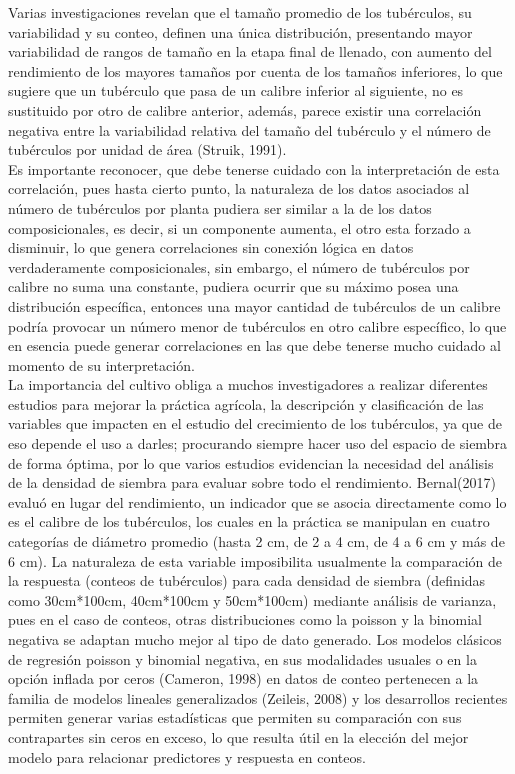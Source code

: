 Varias investigaciones revelan que el tamaño promedio de los tubérculos, su variabilidad y su conteo, definen una única distribución, presentando mayor variabilidad de rangos de tamaño en la etapa final de llenado, con aumento del rendimiento de los mayores tamaños por cuenta de los tamaños inferiores, lo que sugiere que un tubérculo que pasa de un calibre inferior al siguiente, no es sustituido por otro de calibre anterior, además, parece existir una correlación negativa entre la variabilidad relativa del tamaño del tubérculo y el número de tubérculos por unidad de área (Struik, 1991).\\

Es importante reconocer, que debe tenerse cuidado con la interpretación de esta correlación, pues hasta cierto punto, la naturaleza de los datos asociados al número de tubérculos por planta pudiera ser similar a la de los datos composicionales, es decir, si un componente aumenta, el otro esta forzado a disminuir, lo que genera correlaciones sin conexión lógica en datos verdaderamente composicionales, sin embargo, el número de tubérculos por calibre no suma una constante, pudiera ocurrir que su máximo posea una distribución específica, entonces una mayor cantidad de tubérculos de un calibre podría provocar un número menor de tubérculos en otro calibre espec\'ifico, lo que en esencia puede generar correlaciones en las que debe tenerse mucho cuidado al momento de su interpretación.\\

 La importancia del cultivo obliga a muchos investigadores a realizar diferentes estudios para mejorar la práctica agrícola, la descripción y clasificación de las variables que impacten en el estudio del crecimiento de los tubérculos, ya que de eso depende el uso a darles;   procurando siempre hacer uso del espacio de siembra de forma óptima, por lo que varios estudios evidencian la necesidad del an\'alisis de la densidad de siembra para evaluar sobre todo el rendimiento. Bernal(2017) evaluó en lugar del rendimiento, un indicador que se asocia directamente como lo es el calibre de los tubérculos, los cuales en la práctica se manipulan en cuatro categorías de diámetro promedio (hasta 2 cm, de 2 a 4 cm, de 4 a 6 cm y más de 6 cm). La naturaleza de esta variable imposibilita usualmente la comparación de la respuesta (conteos de tubérculos) para cada densidad de siembra (definidas como 30cm*100cm, 40cm*100cm y 50cm*100cm) mediante análisis de varianza, pues en el caso de conteos, otras distribuciones como la poisson y la binomial negativa se adaptan mucho mejor al tipo de dato generado. Los modelos clásicos de regresión poisson y binomial negativa, en sus modalidades usuales o en la opción inflada por ceros (Cameron, 1998) en datos de conteo pertenecen a la familia de modelos lineales generalizados (Zeileis, 2008) y los desarrollos recientes permiten generar varias estadísticas que permiten su comparación con sus contrapartes sin ceros en exceso, lo que resulta útil en la elección del mejor modelo para relacionar predictores y respuesta en conteos.\\

